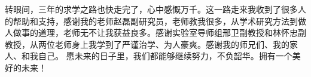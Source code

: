 \cleardoublepage
{}
转眼间，三年的求学之路也快走完了，心中感慨万千。这一路走来我收到了很多人的帮助和支持，感谢我的老师赵磊副研究员，老师教我很多，从学术研究方法到做人做事的道理，老师无不让我获益良多。感谢实验室导师组邢卫副教授和林怀忠副教授，从两位老师身上我学到了严谨治学、为人豪爽。感谢我的师兄们、我的家人、和我自己。
愿未来的日子里，我们都能够继续努力，不负韶华。拥有一个美好的未来！